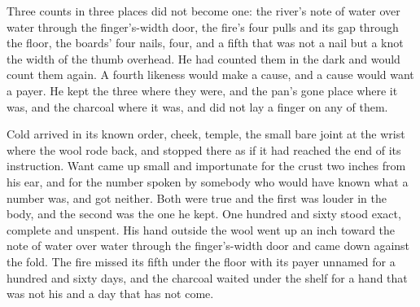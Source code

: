 Three counts in three places did not become one: the river's note of water over water through the finger's-width door, the fire's four pulls and its gap through the floor, the boards' four nails, four, and a fifth that was not a nail but a knot the width of the thumb overhead. He had counted them in the dark and would count them again. A fourth likeness would make a cause, and a cause would want a payer. He kept the three where they were, and the pan's gone place where it was, and the charcoal where it was, and did not lay a finger on any of them.

Cold arrived in its known order, cheek, temple, the small bare joint at the wrist where the wool rode back, and stopped there as if it had reached the end of its instruction. Want came up small and importunate for the crust two inches from his ear, and for the number spoken by somebody who would have known what a number was, and got neither. Both were true and the first was louder in the body, and the second was the one he kept. One hundred and sixty stood exact, complete and unspent. His hand outside the wool went up an inch toward the note of water over water through the finger's-width door and came down against the fold. The fire missed its fifth under the floor with its payer unnamed for a hundred and sixty days, and the charcoal waited under the shelf for a hand that was not his and a day that has not come.
